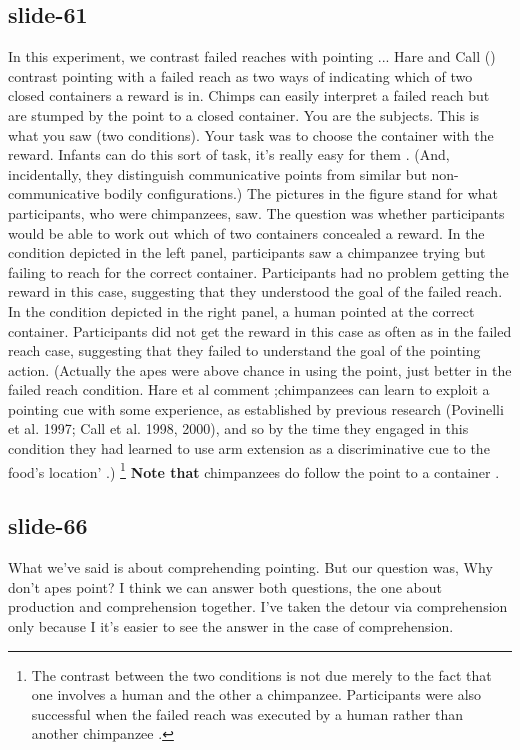 \documentclass[12pt,\papersize]{extarticle}
\begin{document}
 
\subsection{slide-61}
In this experiment, we contrast failed reaches with pointing ...
Hare and Call (\citeyear{hare_chimpanzees_2004}) contrast pointing with a failed reach as two ways of indicating which of two closed containers a reward is in. Chimps can easily interpret a failed reach but are stumped by the point to a closed container.
You are the subjects. This is what you saw (two conditions). Your task was to choose the container with the reward.
Infants can do this sort of task, it's really easy for them \citep{Behne:2005qh}. (And, incidentally, they distinguish communicative points from similar but non-communicative bodily configurations.)
The pictures in the figure stand for what participants, who were chimpanzees, saw.
The question was whether participants would be able to work out which of two containers concealed a reward.
In the condition depicted in the left panel, participants saw a chimpanzee trying but failing to reach for the correct container.
Participants had no problem getting the reward in this case, suggesting that they understood the goal of the failed reach.
In the condition depicted in the right panel, a human pointed at the correct container.
Participants did not get the reward in this case as often as in the failed reach case, suggesting that they failed to understand the goal of the pointing action.
(Actually the apes were above chance in using the point, just better in the failed reach condition. Hare et al comment ;chimpanzees can learn to exploit a pointing cue with some experience, as established by previous research (Povinelli et al. 1997; Call et al. 1998, 2000), and so by the time they engaged in this condition they had learned to use arm extension as a discriminative cue to the food’s location' \citep[p.\ 578]{hare_chimpanzees_2004}.)
\footnote{ The contrast between the two conditions is not due merely to the fact that one involves a human and the other a chimpanzee. Participants were also successful when the failed reach was executed by a human rather than another chimpanzee \citep[][experiment 1]{hare_chimpanzees_2004}. }
\textbf{Note that} chimpanzees do follow the point to a container \citep[see][p.\ 6]{Moll:2007gu}.
 
 
\subsection{slide-66}
What we've said is about comprehending pointing.
But our question was, Why don't apes point?
I think we can answer both questions, the one about production and comprehension together.
I've taken the detour via comprehension only because I it's easier to see the answer in the case of comprehension.
 
\end{document}
